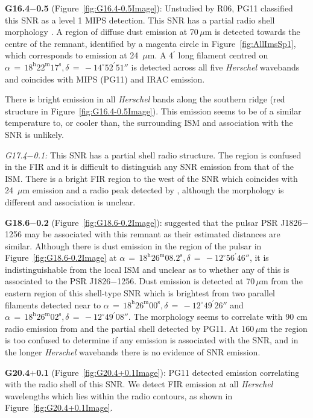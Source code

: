 \documentclass[fleqn,usenatbib]{mnras}
\begin{document}
{\textbf{G16.4$-$0.5} (Figure~\ref{fig:G16.4-0.5Image}): Unstudied by R06, PG11 classified this SNR as a level 1 MIPS detection. This SNR has a partial radio shell morphology \citep{Brogan2006}. A region of diffuse dust emission at 70\,$\mu$m is detected towards the centre of the remnant, identified by a magenta circle in Figure~\ref{fig:AllImsSp1}, which corresponds to emission at 24~$\mu$m. A 4$^\prime$ long filament centred on $\alpha\,=\,18^\text{h}22^\text{m}17^\text{s}, \delta\,=\,-14^\circ52^\prime51''$ is detected across all five \textit{Herschel} wavebands and coincides with MIPS (PG11) and IRAC emission.

There is bright emission in all \textit{Herschel} bands along the southern ridge (red structure in Figure~\ref{fig:G16.4-0.5Image}). This emission seems to be of a similar temperature to, or cooler than, the surrounding ISM and association with the SNR is unlikely.
\bigskip

\textit{G17.4$-$0.1:} This SNR has a partial shell radio structure. The region is confused in the FIR and it is difficult to distinguish any SNR emission from that of the ISM. There is a bright FIR region to the west of the SNR which coincides with 24~$\mu$m emission and a radio peak detected by \citet{Brogan2006}, although the morphology is different and association is unclear.
\bigskip

\textbf{G18.6$-$0.2} (Figure~\ref{fig:G18.6-0.2Image}): \citet{Voisin2016} suggested that the pulsar PSR J1826$-$1256 may be associated with this remnant as their estimated distances are similar. Although there is dust emission in the region of the pulsar in Figure~\ref{fig:G18.6-0.2Image} at $\alpha\,=\,18^\text{h}26^\text{m}08.2^\text{s}, \delta\,=\,-12^\circ56^\prime46''$, it is indistinguishable from the local ISM and unclear as to whether any of this is associated to the PSR J1826$-$1256.
Dust emission is detected at 70\,$\mu$m from the eastern region of this shell-type SNR which is brightest from two parallel filaments detected near to $\alpha\,=\,18^\text{h}26^\text{m}00^\text{s}, \delta\,=\,-12^\circ49^\prime26''$ and $\alpha\,=\,18^\text{h}26^\text{m}02^\text{s}, \delta\,=\,-12^\circ49^\prime08''$. The morphology seems to correlate with 90 cm radio emission from \citet{Brogan2006} and the partial shell detected by PG11. At 160\,$\mu$m the region is too confused to determine if any emission is associated with the SNR, and in the longer \textit{Herschel} wavebands there is no evidence of SNR emission.
\bigskip

\textbf{G20.4$+$0.1} (Figure~\ref{fig:G20.4+0.1Image}): PG11 detected emission correlating with the radio shell of this SNR. We detect FIR emission at all \textit{Herschel} wavelengths which lies within the radio contours, as shown in Figure~\ref{fig:G20.4+0.1Image}.
\bigskip

}
\end{document}
